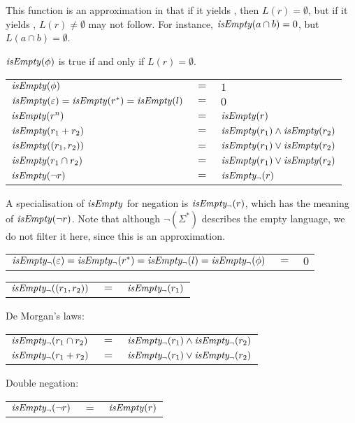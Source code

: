 This function is an approximation in that if it yields \true, then $L(r) =
\emptyset$, but if it yields \false, $L(r) \neq \emptyset$ may not follow. For
instance, $\mathit{isEmpty}(a \cap b) = 0$, but $L(a \cap b) = \emptyset$.

\begin{defn}[Approximation for $L(r) = \emptyset$]
   \label{defn-isempty}
   $\mathit{isEmpty}(\phi)$ is true if and only if $L(r) = \emptyset$.

   \begin{tabular}{lll}
      $\mathit{isEmpty}(\phi)$	& 	$=$ & $1$ \\
      $\mathit{isEmpty}(\varepsilon) = \mathit{isEmpty}(r^*) = \mathit{isEmpty}(l)$
         & $=$ & $0$ \\
      $\mathit{isEmpty}(r^n)$		& $=$ & $\mathit{isEmpty}(r)$ \\
      $\mathit{isEmpty}(r_1 + r_2)$	& $=$ & $\mathit{isEmpty}(r_1) \wedge \mathit{isEmpty}(r_2)$ \\
      $\mathit{isEmpty}((r_1, r_2))$	& $=$ & $\mathit{isEmpty}(r_1) \vee \mathit{isEmpty}(r_2)$ \\
      $\mathit{isEmpty}(r_1 \cap r_2)$	& $=$ & $\mathit{isEmpty}(r_1) \vee \mathit{isEmpty}(r_2)$ \\
      $\mathit{isEmpty}(\neg r)$	& $=$ & $\mathit{isEmpty_\neg}(r)$ \\
   \end{tabular}

   A specialisation of $\mathit{isEmpty}$ for negation is $\mathit{isEmpty_\neg}(r)$, which has
   the meaning of $\mathit{isEmpty}(\neg r)$. Note that although $\neg(\Sigma^*)$
   describes the empty language, we do not filter it here, since this is an
   approximation.

   \begin{tabular}{lll}
      $\mathit{isEmpty_\neg}(\varepsilon) = \mathit{isEmpty_\neg}(r^*) = \mathit{isEmpty_\neg}(l) = \mathit{isEmpty_\neg}(\phi)$ & $=$ & $0$ \\
   \end{tabular}

   \begin{tabular}{lll}
      $\mathit{isEmpty_\neg}((r_1, r_2))$		& $=$ & $\mathit{isEmpty_\neg}(r_1)$ \\
   \end{tabular}

   De Morgan's laws:

   \begin{tabular}{lll}
      $\mathit{isEmpty_\neg}(r_1 \cap r_2)$	& $=$ & $\mathit{isEmpty_\neg}(r_1) \wedge \mathit{isEmpty_\neg}(r_2)$ \\
      $\mathit{isEmpty_\neg}(r_1 + r_2)$		& $=$ & $\mathit{isEmpty_\neg}(r_1) \vee \mathit{isEmpty_\neg}(r_2)$ \\
   \end{tabular}

   Double negation:

   \begin{tabular}{lll}
      $\mathit{isEmpty_\neg}(\neg r)$	& $=$ & $\mathit{isEmpty}(r)$ \\
   \end{tabular}
\end{defn}

